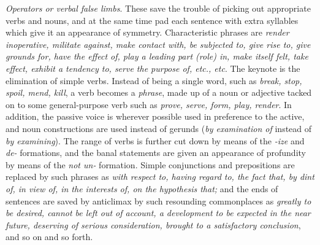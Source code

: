\documentclass[article,twoside,a4paper]{memoir}
\begin{document}
\emph{Operators or verbal false limbs}. These save the trouble of picking out
appropriate verbs and nouns, and at the same time pad each sentence with extra
syllables which give it an appearance of symmetry. Characteristic phrases are
\emph{render inoperative, militate against, make contact with, be subjected to,
  give rise to, give grounds for, have the effect of, play a leading part (role)
  in, make itself felt, take effect, exhibit a tendency to, serve the purpose
  of, etc., etc}. The keynote is the elimination of simple verbs. Instead of
being a single word, such as \emph{break, stop, spoil, mend, kill}, a verb becomes
a \emph{phrase}, made up of a noun or adjective tacked on to some general-purpose
verb such as \emph{prove, serve, form, play, render}. In addition, the passive
voice is wherever possible used in preference to the active, and noun constructions
are used instead of gerunds (\emph{by examination of} instead of \emph{by examining}).
The range of verbs is further cut down by means of the \emph{-ize} and \emph{de-}
formations, and the banal statements are given an appearance of profundity by
means of the \emph{not un-} formation. Simple conjunctions and prepositions
are replaced by such phrases as \emph{with respect to, having regard to, the fact
  that, by dint of, in view of, in the interests of, on the hypothesis that; }and
the ends of sentences are saved by anticlimax by such resounding commonplaces
as \emph{greatly to be desired, cannot be left out of account, a development to
  be expected in the near future, deserving of serious consideration, brought
  to a satisfactory conclusion}, and so on and so forth.
\end{document}
